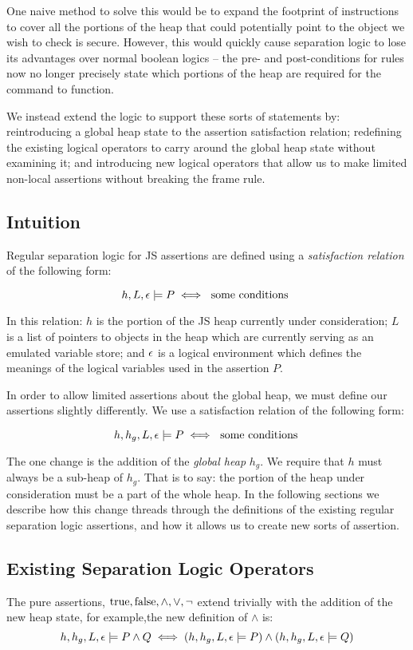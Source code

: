 \documentclass[a4paper,notitlepage]{report}
\begin{document}
One naive method to solve this would be to expand the footprint of instructions
to cover all the portions of the heap that could potentially point to the object
we wish to check is secure. However, this would quickly cause separation logic
to lose its advantages over normal boolean logics -- the pre- and
post-conditions for rules now no longer precisely state which portions of the
heap are required for the command to function.

We instead extend the logic to support these sorts of statements by: reintroducing a global heap state to the
assertion satisfaction relation; redefining the existing logical operators to
carry around the global heap state without examining it; and introducing new
logical operators that allow us to make limited non-local assertions without
breaking the frame rule.

\subsection{Intuition}
\label{sec:extendingseplog:intuition}

Regular separation logic for JS assertions are defined using a
\emph{satisfaction relation} of the following form:

\[
h,L,\epsilon \models P \iff \text{ some conditions }
\]

In this relation: $h$ is the portion of the JS heap currently under
consideration; $L$ is a list of pointers to objects in the heap which are
currently serving as an emulated variable store; and $\epsilon$ is a logical
environment which defines the meanings of the logical variables used in the
assertion $P$.

In order to allow limited assertions about the global heap, we must define our
assertions slightly differently. We use a satisfaction relation of the following
form:

\[
h,h_g,L,\epsilon \models P \iff \text{ some conditions }
\]

The one change is the addition of the \emph{global heap} $h_g$. We require that
$h$ must always be a sub-heap of $h_g$. That is to say: the portion of the heap
under consideration must be a part of the whole heap. In the following sections
we describe how this change threads through the definitions of the existing
regular separation logic assertions, and how it allows us to create new sorts of
assertion.

\subsection{Existing Separation Logic Operators}
The pure assertions, $\text{true},\text{false},\land,\lor,\lnot$ extend trivially with the
addition of the new heap state, for example,the new definition of $\land$ is:
\[
  h,h_g,L,\epsilon \models P \land Q \iff
    (h,h_g,L,\epsilon \models P) \land (h,h_g,L,\epsilon \models Q)
\]
\end{document}
